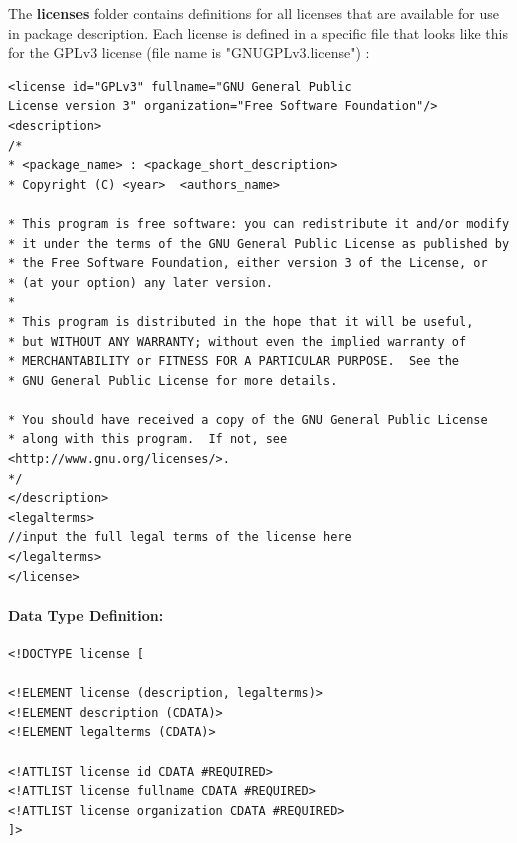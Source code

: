 \documentclass[12pt,a4paper]{article}
\begin{document}
The \textbf{licenses} folder contains definitions for all licenses that are available for use in package description. Each license is defined in a specific file that looks like this for the GPLv3 license (file name is "GNUGPLv3.license") :
\begin{verbatim}
<license id="GPLv3" fullname="GNU General Public 
License version 3" organization="Free Software Foundation"/>
<description>
/*
* <package_name> : <package_short_description>
* Copyright (C) <year>  <authors_name>

* This program is free software: you can redistribute it and/or modify
* it under the terms of the GNU General Public License as published by
* the Free Software Foundation, either version 3 of the License, or
* (at your option) any later version.
*
* This program is distributed in the hope that it will be useful,
* but WITHOUT ANY WARRANTY; without even the implied warranty of
* MERCHANTABILITY or FITNESS FOR A PARTICULAR PURPOSE.  See the
* GNU General Public License for more details.

* You should have received a copy of the GNU General Public License
* along with this program.  If not, see <http://www.gnu.org/licenses/>.
*/
</description>
<legalterms>
//input the full legal terms of the license here
</legalterms>
</license>
\end{verbatim}


\paragraph{Data Type Definition:}
\begin{verbatim}
<!DOCTYPE license [

<!ELEMENT license (description, legalterms)>
<!ELEMENT description (CDATA)>
<!ELEMENT legalterms (CDATA)>

<!ATTLIST license id CDATA #REQUIRED>
<!ATTLIST license fullname CDATA #REQUIRED>
<!ATTLIST license organization CDATA #REQUIRED>
]>
\end{verbatim}
\end{document}
